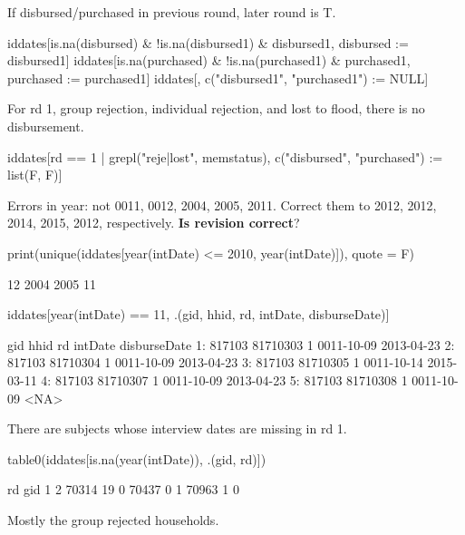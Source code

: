 If disbursed/purchased in previous round, later round is T. 
\begin{Schunk}
\begin{Sinput}
iddates[is.na(disbursed) & !is.na(disbursed1) & disbursed1, 
	disbursed := disbursed1]
iddates[is.na(purchased) & !is.na(purchased1) & purchased1, 
	purchased := purchased1]
iddates[, c("disbursed1", "purchased1") := NULL]
\end{Sinput}
\end{Schunk}
For rd 1, group rejection, individual rejection, and lost to flood, there is no disbursement.
\begin{Schunk}
\begin{Sinput}
iddates[rd == 1 | grepl("reje|lost", memstatus), 
	c("disbursed", "purchased") := list(F, F)]
\end{Sinput}
\end{Schunk}
Errors in year: not 0011, 0012, 2004, 2005, 2011. Correct them to 2012, 2012, 2014, 2015, 2012, respectively. \textbf{Is revision correct}?
\begin{Schunk}
\begin{Sinput}
print(unique(iddates[year(intDate) <= 2010, year(intDate)]), quote = F)
\end{Sinput}
\begin{Soutput}
[1]   12 2004 2005   11
\end{Soutput}
\begin{Sinput}
iddates[year(intDate) == 11, .(gid, hhid, rd, intDate, disburseDate)]
\end{Sinput}
\begin{Soutput}
      gid     hhid rd    intDate disburseDate
1: 817103 81710303  1 0011-10-09   2013-04-23
2: 817103 81710304  1 0011-10-09   2013-04-23
3: 817103 81710305  1 0011-10-14   2015-03-11
4: 817103 81710307  1 0011-10-09   2013-04-23
5: 817103 81710308  1 0011-10-09         <NA>
\end{Soutput}
\end{Schunk}
There are subjects whose interview dates are missing in rd 1. 
\begin{Schunk}
\begin{Sinput}
table0(iddates[is.na(year(intDate)), .(gid, rd)])
\end{Sinput}
\begin{Soutput}
       rd
gid      1  2
  70314 19  0
  70437  0  1
  70963  1  0
\end{Soutput}
\end{Schunk}
Mostly the group rejected households.

